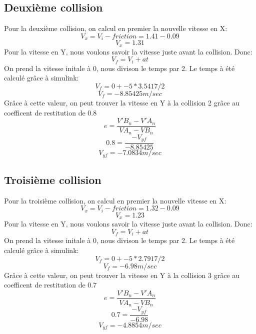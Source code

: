 \documentclass{article}
\begin{document}
\subsection{Deuxième collision}
Pour la deuxième collision, on calcul en premier la nouvelle vitesse en X:
\begin{equation}
V_x = V_i - friction = 1.41-0.09
\end{equation}
\begin{equation}
V_x = 1.31
\end{equation}
Pour la vitesse en Y, nous voulons savoir la vitesse juste avant la collision. Donc: 
\begin{equation}
V_f = V_i + at
\end{equation}
On prend la vitesse initale à 0, nous divison le temps par 2. Le temps à été calculé grâce à simulink:
\begin{equation}
V_f = 0 + -5*3.5417/2
\end{equation}
\begin{equation}
V_f = -8.85425 m/sec 
\end{equation}
Grâce à cette valeur, on peut trouver la vitesse en Y à la collision 2 grâce au coefficent de restitution de 0.8
\begin{equation}
e = \frac{V'B_n-V'A_n}{VA_n-VB_n}
\end{equation}
\begin{equation}
0.8 = \frac{-V_{yf}}{-8.85425}
\end{equation}
\begin{equation}
V_{yf} = -7.0834 m/sec
\end{equation}
\subsection{Troisième collision}
Pour la troisième collision, on calcul en premier la nouvelle vitesse en X:
\begin{equation}
V_x = V_i - friction = 1.32-0.09
\end{equation}
\begin{equation}
V_x = 1.23
\end{equation}
Pour la vitesse en Y, nous voulons savoir la vitesse juste avant la collision. Donc: 
\begin{equation}
V_f = V_i + at
\end{equation}
On prend la vitesse initale à 0, nous divison le temps par 2. Le temps à été calculé grâce à simulink:
\begin{equation}
V_f = 0 + -5*2.7917/2
\end{equation}
\begin{equation}
V_f = -6.98 m/sec 
\end{equation}
Grâce à cette valeur, on peut trouver la vitesse en Y à la collision 3 grâce au coefficent de restitution de 0.7
\begin{equation}
e = \frac{V'B_n-V'A_n}{VA_n-VB_n}
\end{equation}
\begin{equation}
0.7 = \frac{-V_{yf}}{-6.98}
\end{equation}
\begin{equation}
V_{yf} = -4.8854 m/sec
\end{equation}
 
\end{document}
